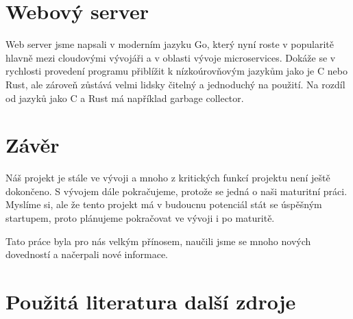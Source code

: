 \documentclass[12pt,a4paper]{article}
\begin{document}
\section{Webový server}

Web server jsme napsali v moderním jazyku Go, který nyní roste v popularitě hlavně mezi cloudovými vývojáři a v oblasti vývoje microservices. Dokáže se v rychlosti provedení programu přiblížit k nízkoúrovňovým jazykům jako je C nebo Rust, ale zároveň zůstává velmi lidsky čitelný a jednoduchý na použití. Na rozdíl od jazyků jako C a Rust má například garbage collector.


\section{Závěr}

Náš projekt je stále ve vývoji a mnoho z kritických funkcí projektu není ještě dokončeno. S vývojem dále pokračujeme, protože se jedná o naši maturitní práci. Myslíme si, ale že tento projekt má v budoucnu potenciál stát se úspěšným startupem, proto plánujeme pokračovat ve vývoji i po maturitě.

Tato práce byla pro nás velkým přínosem, naučili jsme se mnoho nových dovedností a načerpali nové informace.


\clearpage

\section{Použitá literatura další zdroje }
\end{document}
